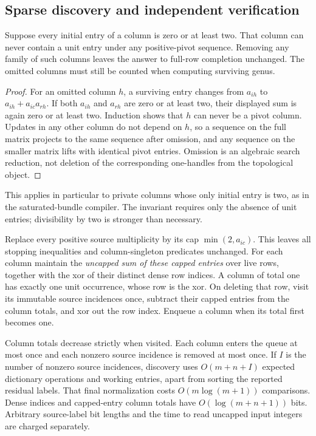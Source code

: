 \subsection{Sparse discovery and independent verification}

\begin{lemma}
\label{lem:inert-columns}
Suppose every initial entry of a column is zero or at least two.  That column
can never contain a unit entry under any positive-pivot sequence.  Removing
any family of such columns leaves the answer to full-row completion unchanged.
The omitted columns must still be counted when computing surviving genus.
\end{lemma}
\begin{proof}
For an omitted column $h$, a surviving entry changes from $a_{ih}$ to
$a_{ih}+a_{ic}a_{rh}$.  If both $a_{ih}$ and $a_{rh}$ are zero or at least
two, their displayed sum is again zero or at least two.  Induction shows that
$h$ can never be a pivot column.  Updates in any other column do not depend
on $h$, so a sequence on the full matrix projects to the same sequence after
omission, and any sequence on the smaller matrix lifts with identical pivot
entries.  Omission is an algebraic search reduction, not deletion of the
corresponding one-handles from the topological object.
\end{proof}

This applies in particular to private columns whose only initial entry is
two, as in the saturated-bundle compiler.  The invariant requires only the
absence of unit entries; divisibility by two is stronger than necessary.

Replace every positive source multiplicity by its cap $\min(2,a_{ic})$.
This leaves all stopping inequalities and column-singleton predicates
unchanged.  For each column maintain the \emph{uncapped sum of these capped
entries} over live rows, together with the xor of their distinct dense row
indices.  A column of total one has exactly one unit occurrence, whose row
is the xor.  On deleting that row, visit its immutable source incidences
once, subtract their capped entries from the column totals, and xor out the
row index.  Enqueue a column when its total first becomes one.

Column totals decrease strictly when visited.  Each column enters the queue
at most once and each nonzero source incidence is removed at most once.  If
$I$ is the number of nonzero source incidences, discovery uses $O(m+n+I)$
expected dictionary operations and working entries, apart from sorting the
reported residual labels.  That final normalization costs $O(m\log(m+1))$
comparisons.  Dense indices and capped-entry column totals have
$O(\log(m+n+1))$ bits.  Arbitrary source-label bit lengths and the time to
read uncapped input integers are charged separately.

